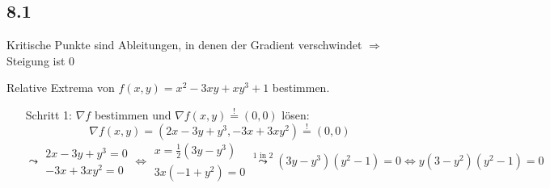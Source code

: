 \documentclass[
    accentcolor=pink,
    boxarc,
    dark_mode,
    logofile=enmpty
]{rubos-tuda-template}
\begin{document}
    \subsection*{8.1}
    \begin{anmerkungen}
        Kritische Punkte sind Ableitungen, in denen der Gradient verschwindet $\Rightarrow$ Steigung ist $0$
    \end{anmerkungen}
    Relative Extrema von $f(x,y)=x^2-3xy+xy^3+1$ bestimmen.
    \begin{itemize}
        \item[Schritt 1:]$\nabla f$ bestimmen und $\nabla f(x,y)\overset{!}{=}(0,0)$ lösen:
            \[\nabla f(x,y)=(2x-3y+y^3,-3x+3xy^2)\overset{!}{=}(0,0)\]
            \[\leadsto\begin{matrix}
                    2x-3y+y^3=0 \\
                    -3x+3xy^2=0
                \end{matrix} \Leftrightarrow %
                \begin{matrix}
                    x=\frac{1}{2}(3y-y^3) \\
                    3x(-1+y^2)=0
                \end{matrix}\overset{\text{1 in 2}}{\leadsto}(3y-y^3)(y^2-1)=0 \Leftrightarrow y(3-y^2)(y^2-1)=0\]


\end{itemize}
\end{document}
